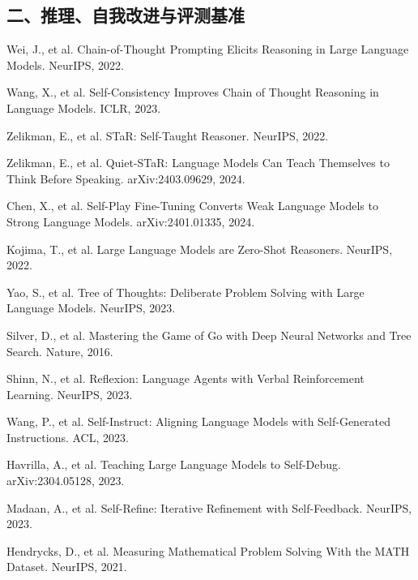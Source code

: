 \documentclass[12pt,a4paper]{article}
\begin{document}
\subsection*{二、推理、自我改进与评测基准}
\begin{enumerate}[label={[\arabic*]}, resume]
    \item Wei, J., et al. Chain-of-Thought Prompting Elicits Reasoning in Large Language Models. NeurIPS, 2022.

    \item Wang, X., et al. Self-Consistency Improves Chain of Thought Reasoning in Language Models. ICLR, 2023.

    \item Zelikman, E., et al. STaR: Self-Taught Reasoner. NeurIPS, 2022.

    \item Zelikman, E., et al. Quiet-STaR: Language Models Can Teach Themselves to Think Before Speaking. arXiv:2403.09629, 2024.

    \item Chen, X., et al. Self-Play Fine-Tuning Converts Weak Language Models to Strong Language Models. arXiv:2401.01335, 2024.

    \item Kojima, T., et al. Large Language Models are Zero-Shot Reasoners. NeurIPS, 2022.

    \item Yao, S., et al. Tree of Thoughts: Deliberate Problem Solving with Large Language Models. NeurIPS, 2023.

    \item Silver, D., et al. Mastering the Game of Go with Deep Neural Networks and Tree Search. Nature, 2016.

    \item Shinn, N., et al. Reflexion: Language Agents with Verbal Reinforcement Learning. NeurIPS, 2023.

    \item Wang, P., et al. Self-Instruct: Aligning Language Models with Self-Generated Instructions. ACL, 2023.

    \item Havrilla, A., et al. Teaching Large Language Models to Self-Debug. arXiv:2304.05128, 2023.

    \item Madaan, A., et al. Self-Refine: Iterative Refinement with Self-Feedback. NeurIPS, 2023.

    \item Hendrycks, D., et al. Measuring Mathematical Problem Solving With the MATH Dataset. NeurIPS, 2021.


\end{enumerate}
\end{document}
